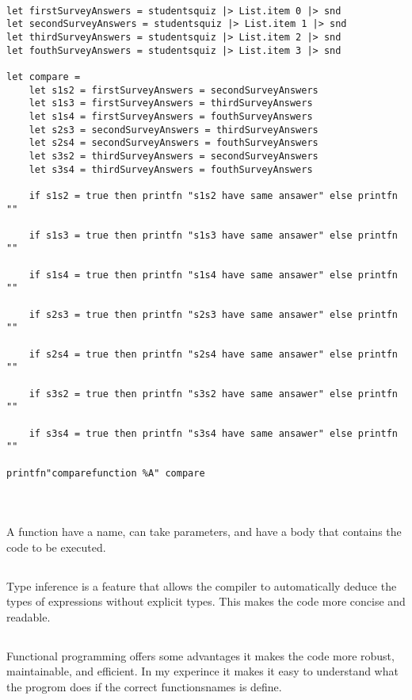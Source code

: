 \documentclass{article}
\begin{document}
 \begin{lstlisting}

let firstSurveyAnswers = studentsquiz |> List.item 0 |> snd
let secondSurveyAnswers = studentsquiz |> List.item 1 |> snd
let thirdSurveyAnswers = studentsquiz |> List.item 2 |> snd
let fouthSurveyAnswers = studentsquiz |> List.item 3 |> snd

let compare = 
    let s1s2 = firstSurveyAnswers = secondSurveyAnswers
    let s1s3 = firstSurveyAnswers = thirdSurveyAnswers
    let s1s4 = firstSurveyAnswers = fouthSurveyAnswers
    let s2s3 = secondSurveyAnswers = thirdSurveyAnswers
    let s2s4 = secondSurveyAnswers = fouthSurveyAnswers
    let s3s2 = thirdSurveyAnswers = secondSurveyAnswers
    let s3s4 = thirdSurveyAnswers = fouthSurveyAnswers

    if s1s2 = true then printfn "s1s2 have same ansawer" else printfn ""

    if s1s3 = true then printfn "s1s3 have same ansawer" else printfn ""

    if s1s4 = true then printfn "s1s4 have same ansawer" else printfn ""

    if s2s3 = true then printfn "s2s3 have same ansawer" else printfn ""

    if s2s4 = true then printfn "s2s4 have same ansawer" else printfn ""

    if s3s2 = true then printfn "s3s2 have same ansawer" else printfn ""

    if s3s4 = true then printfn "s3s4 have same ansawer" else printfn ""

printfn"comparefunction %A" compare


    \end{lstlisting}



\section{}

\subsection{}

A function have a name, can take parameters, and have a body that contains the code to be executed.

\subsection{}
Type inference is a feature that allows the compiler to automatically deduce the types of expressions without explicit types. This makes the code more concise and readable. 

\subsection{}

Functional programming offers some advantages it makes the code more robust, maintainable, and efficient. In my experince it makes it easy to understand what the progrom does if the correct functionsnames is define.
\end{document}
